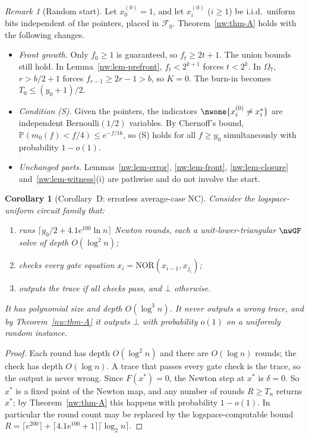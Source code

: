 \documentclass[11pt]{amsart}
\newtheorem{corollary}[theorem]{Corollary}
\theoremstyle{definition}
\theoremstyle{remark}
\newtheorem{remark}[theorem]{Remark}
\newcommand{\NOR}{\mathrm{NOR}}
\newcommand{\PP}{\mathbb{P}}
\newcommand{\cF}{\mathcal{F}}
\begin{document}
\begin{remark}[Random start]\label{nw:rem-random-start}
Let $x^{(0)}_0=1$, and let $x^{(0)}_i$ ($i\ge1$) be i.i.d.\ uniform bits
independent of the pointers, placed in $\cF_0$. Theorem~\ref{nw:thm-A} holds
with the following changes.
\begin{itemize}[leftmargin=*]
\item \emph{Front growth.} Only $f_0\ge1$ is guaranteed, so $f_t\ge2t+1$. The
  union bounds still hold. In Lemma~\ref{nw:lem-prefront}, $f_t<2^{k+1}$
  forces $t<2^k$. In $\Omega_7$, $r>b/2+1$ forces $f_{r-1}\ge2r-1>b$, so
  $K=0$. The burn-in becomes $T_0\le(y_0+1)/2$.
\item \emph{Condition \textup{(S)}.} Given the pointers, the indicators
  $\nwone\{x^{(0)}_i\ne x^*_i\}$ are independent Bernoulli$(1/2)$ variables.
  By Chernoff's bound, $\PP(m_0(f)<f/4)\le e^{-f/16}$, so (S) holds for all $f\ge y_0$
  simultaneously with probability $1-o(1)$.
\item \emph{Unchanged parts.} Lemmas~\ref{nw:lem-error}, \ref{nw:lem-front},
  \ref{nw:lem-closure} and~\ref{nw:lem-witness}(i) are pathwise and do not
  involve the start.
\end{itemize}
\end{remark}

\begin{corollary}[Corollary~D: errorless average-case NC]\label{nw:cor-D}
Consider the logspace-uniform circuit family that:
\begin{enumerate}[label=(\arabic*),leftmargin=*]
\item runs $\lceil y_0/2+4.1e^{100}\ln n\rceil$ Newton rounds, each a
  unit-lower-triangular $\nwGF$ solve of depth $O(\log^2n)$;
\item checks every gate equation $x_i=\NOR(x_{i-1},x_{j_i})$;
\item outputs the trace if all checks pass, and $\bot$ otherwise.
\end{enumerate}
It has polynomial size and depth $O(\log^3n)$. It never outputs a wrong trace,
and by Theorem~\ref{nw:thm-A} it outputs $\bot$ with probability $o(1)$ on a
uniformly random instance.
\end{corollary}

\begin{proof}
Each round has depth $O(\log^2 n)$ and there are $O(\log n)$ rounds; the
check has depth $O(\log n)$. A trace that passes every gate check is the
trace, so the output is never wrong. Since $F(x^*)=0$, the Newton step at
$x^*$ is $\delta=0$. So $x^*$ is a fixed point of the Newton map, and any
number of rounds $R\ge T_n$ returns $x^*$; by Theorem~\ref{nw:thm-A} this
happens with probability $1-o(1)$. In particular the round count may be
replaced by the logspace-computable bound
$R=\lceil e^{200}\rceil+\lceil4.1e^{100}+1\rceil\lceil\log_2n\rceil$.
\end{proof}
\end{document}
